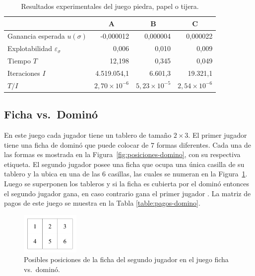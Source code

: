 \begin{table}[t]
\caption{Resultados experimentales del juego piedra, papel o tijera.}
\label{table:resultados-rm-RPS}
\centering
\begin{tabular}{l r r r}
    \toprule
    & \multicolumn{1}{c}{A} & \multicolumn{1}{c}{B} & \multicolumn{1}{c}{C} \\ \midrule
    Ganancia esperada $u(\sigma)$         & -0,000012 & 0,000004 & 0,000022 \\
    Explotabilidad $\varepsilon_{\sigma}$ &  0,006 & 0,010 & 0,009 \\
    Tiempo $T$                            & 12,198 & 0,345 & 0,049 \\
    Iteraciones $I$                       & 4.519.054,1 & 6.601,3 &  19.321,1 \\
    $T/I$                                 & $2,70{\times}10^{-6}$ & $5,23{\times}10^{-5}$ & $2,54{\times}10^{-6}$\\
    \bottomrule
\end{tabular}
\end{table}

\subsection*{Ficha vs.\ Dominó}

En este juego cada jugador tiene un tablero de tamaño $2\times 3$. El primer jugador tiene una ficha de dominó que puede colocar de $7$ formas diferentes. Cada una de las formas es mostrada en la Figura~\ref{fig:posiciones-domino}, con su respectiva etiqueta. El segundo jugador posee una ficha que ocupa una única casilla de su tablero y la ubica en una de las $6$ casillas, las cuales se numeran en la Figura~\ref{fig:posiciones}. Luego se superponen los tableros y si la ficha es cubierta por el dominó entonces el segundo jugador gana, en caso contrario gana el primer jugador \cite[p. 237]{bib:pl-chvatal}. La matriz de pagos de este juego se muestra en la Tabla \ref{table:pagos-domino}.

\begin{figure}[t]
\centering
\includegraphics[width=0.25\textwidth]{figuras/posiciones.png}
\caption{Posibles posiciones de la ficha del segundo jugador en el juego ficha vs.\ dominó.}
\label{fig:posiciones}
\end{figure}

